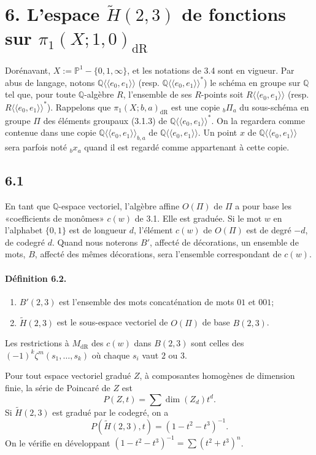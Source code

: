 \documentclass[10pt]{article}
\newcommand{\Q}{\mathbb Q}
\newcommand{\PP}{\mathbb P}
\newcommand{\dR}{\mathrm{dR}}
\begin{document}
\section*{6. L'espace $\widetilde H(2,3)$ de fonctions sur $\pi_1(X;1,0)_{\dR}$}
Dorénavant, $X:=\PP^1-\{0,1,\infty\}$, et les notations de 3.4 sont en vigueur. Par abus de langage, notons $\Q\langle\!\langle e_0,e_1\rangle\!\rangle$ (resp. $\Q\langle\!\langle e_0,e_1\rangle\!\rangle^*$) le schéma en groupe sur $\Q$ tel que, pour toute $\Q$-algèbre $R$, l'ensemble de ses $R$-points soit $R\langle\!\langle e_0,e_1\rangle\!\rangle$ (resp. $R\langle\!\langle e_0,e_1\rangle\!\rangle^*$). Rappelons que $\pi_1(X;b,a)_{\dR}$ est une copie ${}_b\Pi_a$ du sous-schéma en groupe $\Pi$ des éléments groupaux (3.1.3) de $\Q\langle\!\langle e_0,e_1\rangle\!\rangle^*$. On la regardera comme contenue dans une copie $\Q\langle\!\langle e_0,e_1\rangle\!\rangle_{b,a}$ de $\Q\langle\!\langle e_0,e_1\rangle\!\rangle$. Un point $x$ de $\Q\langle\!\langle e_0,e_1\rangle\!\rangle$ sera parfois noté ${}_b x_a$ quand il est regardé comme appartenant à cette copie.

\subsection*{6.1}
En tant que $\Q$-espace vectoriel, l'algèbre affine $O(\Pi)$ de $\Pi$ a pour base les «coefficients de monômes» $c(w)$ de 3.1. Elle est graduée. Si le mot $w$ en l'alphabet $\{0,1\}$ est de longueur $d$, l'élément $c(w)$ de $O(\Pi)$ est de degré $-d$, de codegré $d$. Quand nous noterons $B'$, affecté de décorations, un ensemble de mots, $B$, affecté des mêmes décorations, sera l'ensemble correspondant de $c(w)$.

\paragraph{Définition 6.2.}
\begin{enumerate}[label=(\roman*)]
\item $B'(2,3)$ est l'ensemble des mots concaténation de mots $01$ et $001$;
\item $\widetilde H(2,3)$ est le sous-espace vectoriel de $O(\Pi)$ de base $B(2,3)$.
\end{enumerate}
Les restrictions à $M_{\dR}$ des $c(w)$ dans $B(2,3)$ sont celles des $(-1)^k\zeta^m(s_1,\ldots,s_k)$ où chaque $s_i$ vaut $2$ ou $3$.

Pour tout espace vectoriel gradué $Z$, à composantes homogènes de dimension finie, la série de Poincaré de $Z$ est
\begin{equation}
P(Z,t)=\sum \dim(Z_d)t^d .
\tag{6.2.1}
\end{equation}
Si $\widetilde H(2,3)$ est gradué par le codegré, on a
\begin{equation}
P(\widetilde H(2,3),t)=(1-t^2-t^3)^{-1}.
\tag{6.2.2}
\end{equation}
On le vérifie en développant $(1-t^2-t^3)^{-1}=\sum(t^2+t^3)^n$.
\end{document}
